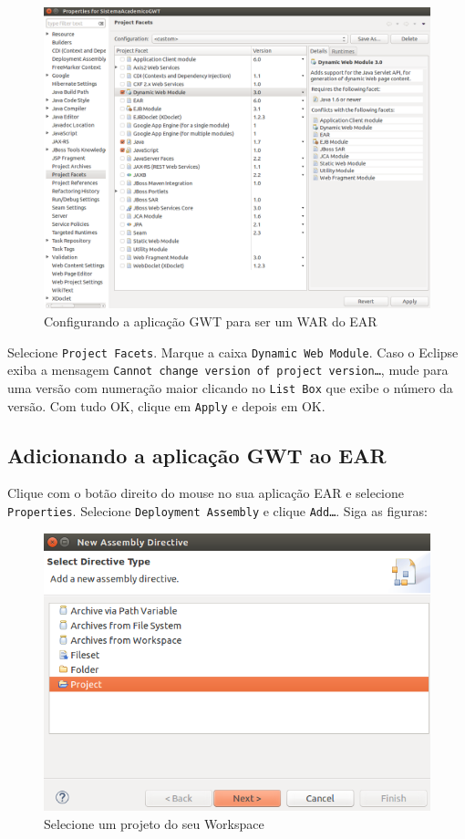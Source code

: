\begin{figure}[H]
	\centering
	\includegraphics[scale=0.4]{files/imgs/gwt-07.png}
	\caption{Configurando a aplicação GWT para ser um WAR do EAR}
	\label{gwt07}
\end{figure}

Selecione \texttt{Project Facets}. Marque a caixa \texttt{Dynamic Web Module}. Caso o Eclipse exiba a mensagem \texttt{Cannot
change version of project version\ldots}, mude para uma versão com numeração maior clicando no \texttt{List Box} que exibe o
número da versão. Com tudo OK, clique em \texttt{Apply} e depois em OK.

\subsection{Adicionando a aplicação GWT ao EAR}

Clique com o botão direito do mouse no sua aplicação EAR e selecione \texttt{Properties}. Selecione \texttt{Deployment Assembly} e
clique \texttt{Add\ldots}. Siga as figuras:

\begin{figure}[H]
	\centering
	\includegraphics[scale=0.5]{files/imgs/gwt-08.png}
	\caption{Selecione um projeto do seu Workspace}
	\label{gwt08}
\end{figure}

